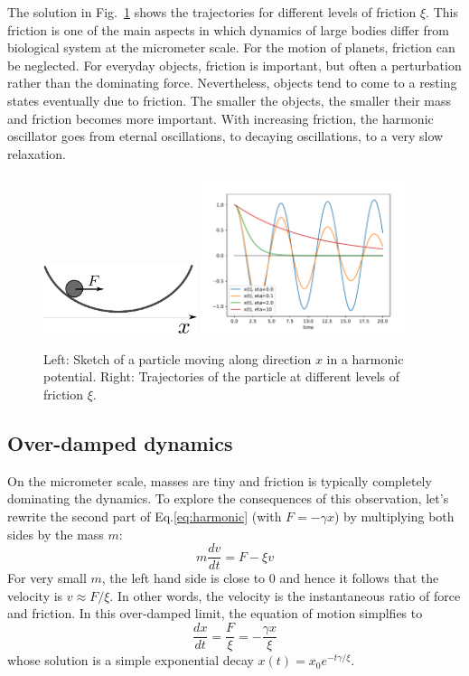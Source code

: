 The solution in Fig.~\ref{fig:harmonic} shows the trajectories for different levels of friction $\xi$.
This friction is one of the main aspects in which dynamics of large bodies differ from biological system at the micrometer scale.
For the motion of planets, friction can be neglected.
For everyday objects, friction is important, but often a perturbation rather than the dominating force. Nevertheless, objects tend to come to a resting states eventually due to friction.
The smaller the objects, the smaller their mass and friction becomes more important.
With increasing friction, the harmonic oscillator goes from eternal oscillations, to decaying oscillations, to a very slow relaxation.

\begin{figure}
    \includegraphics[width=0.4\textwidth]{figures/harmonic.pdf}
    \includegraphics[width=0.55\textwidth]{figures/harmonic_traj.pdf}
    \caption{\label{fig:harmonic}Left: Sketch of a particle moving along direction $x$ in a harmonic potential. Right: Trajectories of the particle at different levels of friction $\xi$.}
\end{figure}


\subsection{Over-damped dynamics}
On the micrometer scale, masses are tiny and friction is typically completely dominating the dynamics.
To explore the consequences of this observation, let's rewrite the second part of Eq.\ref{eq:harmonic} (with $F=-\gamma x$) by multiplying both sides by the mass $m$:
\begin{equation}
    m\frac{dv}{dt} = F - \xi v
\end{equation}
For very small $m$, the left hand side is close to $0$ and hence it follows that the velocity is $v \approx F/\xi$.
In other words, the velocity is the instantaneous ratio of force and friction.
In this over-damped limit, the equation of motion simplfies to
\begin{equation}
    \frac{dx}{dt} = \frac{F}{\xi} = -\frac{\gamma x}{\xi}
\end{equation}
whose solution is a simple exponential decay $x(t) = x_0 e^{-t \gamma/\xi}$.

